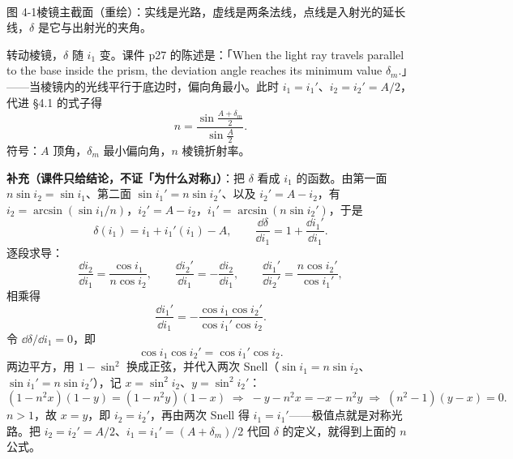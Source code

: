\documentclass[11pt]{ctexart}
\begin{document}
\begin{center}\begin{minipage}{0.97\linewidth}\centering
{}\\
{\small 图 4-1\quad 棱镜主截面（重绘）：实线是光路，虚线是两条法线，点线是入射光的延长线，$\delta$ 是它与出射光的夹角。}
\end{minipage}\end{center}


转动棱镜，$\delta$ 随 $i_1$ 变。课件 p27 的陈述是：「When the light ray travels parallel to the base inside the prism, the deviation angle reaches its minimum value $\delta_m$.」——当棱镜内的光线平行于底边时，偏向角最小。此时 $i_1=i_1'$、$i_2=i_2'=A/2$，代进 §4.1 的式子得
\[
n=\frac{\sin\frac{A+\delta_m}{2}}{\sin\frac{A}{2}} .
\]
符号：$A$ 顶角，$\delta_m$ 最小偏向角，$n$ 棱镜折射率。

\textbf{补充（课件只给结论，不证「为什么对称」）}：把 $\delta$ 看成 $i_1$ 的函数。由第一面 $n\sin i_2=\sin i_1$、第二面 $\sin i_1'=n\sin i_2'$、以及 $i_2'=A-i_2$，有 $i_2=\arcsin(\sin i_1/n)$，$i_2'=A-i_2$，$i_1'=\arcsin(n\sin i_2')$，于是
\[
\delta(i_1)=i_1+i_1'(i_1)-A,
\qquad
\frac{\dd\delta}{\dd i_1}=1+\frac{\dd i_1'}{\dd i_1}.
\]
逐段求导：
\[
\frac{\dd i_2}{\dd i_1}=\frac{\cos i_1}{n\cos i_2},
\qquad
\frac{\dd i_2'}{\dd i_1}=-\frac{\dd i_2}{\dd i_1},
\qquad
\frac{\dd i_1'}{\dd i_2'}=\frac{n\cos i_2'}{\cos i_1'},
\]
相乘得
\[
\frac{\dd i_1'}{\dd i_1}=-\frac{\cos i_1\cos i_2'}{\cos i_1'\cos i_2}.
\]
令 $\dd\delta/\dd i_1=0$，即
\[
\cos i_1\cos i_2'=\cos i_1'\cos i_2 .
\]
两边平方，用 $1-\sin^2$ 换成正弦，并代入两次 Snell（$\sin i_1=n\sin i_2$、$\sin i_1'=n\sin i_2'$），记 $x=\sin^2i_2$、$y=\sin^2i_2'$：
\[
(1-n^2x)(1-y)=(1-n^2y)(1-x)
\;\Longrightarrow\;
-y-n^2x=-x-n^2y
\;\Longrightarrow\;
(n^2-1)(y-x)=0 .
\]
$n>1$，故 $x=y$，即 $i_2=i_2'$，再由两次 Snell 得 $i_1=i_1'$——极值点就是对称光路。把 $i_2=i_2'=A/2$、$i_1=i_1'=(A+\delta_m)/2$ 代回 $\delta$ 的定义，就得到上面的 $n$ 公式。
\end{document}
